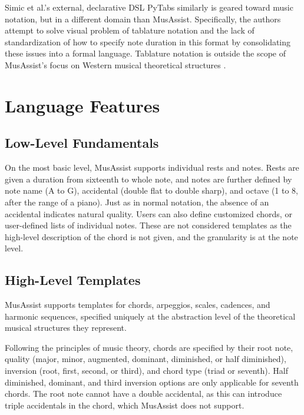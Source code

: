 \documentclass{article}
\begin{document}
Simic et al.’s external, declarative DSL PyTabs similarly is geared toward music notation, but in a different domain than MusAssist. Specifically, the authors attempt to solve visual problem of tablature notation and the lack of standardization of how to specify note duration in this format by consolidating these issues into a formal language. Tablature notation is outside the scope of MusAssist’s focus on Western musical theoretical structures 
 \cite{simic_bal_dejanovic_vaderna}.


\section{Language Features}\label{sec:language_features}
\subsection{Low-Level Fundamentals}
On the most basic level, MusAssist supports individual rests and notes. Rests are given a duration from sixteenth to whole note, and notes are further defined by note name (A to G), accidental (double flat to double sharp), and octave (1 to 8, after the range of a piano). Just as in normal notation, the absence of an accidental indicates natural quality. Users can also define customized chords, or user-defined lists of individual notes. These are not considered templates as the high-level description of the chord is not given, and the granularity is at the note level.

\subsection{High-Level Templates}
MusAssist supports templates for chords, arpeggios, scales, cadences, and harmonic sequences, specified uniquely at the abstraction level of the theoretical musical structures they represent.

Following the principles of music theory, chords are specified by their root note, quality (major, minor, augmented, dominant, diminished, or half diminished), inversion (root, first, second, or third), and chord type (triad or seventh). Half diminished, dominant, and third inversion options are only applicable for seventh chords. The root note cannot have a double accidental, as this can introduce triple accidentals in the chord, which MusAssist does not support.
\end{document}
